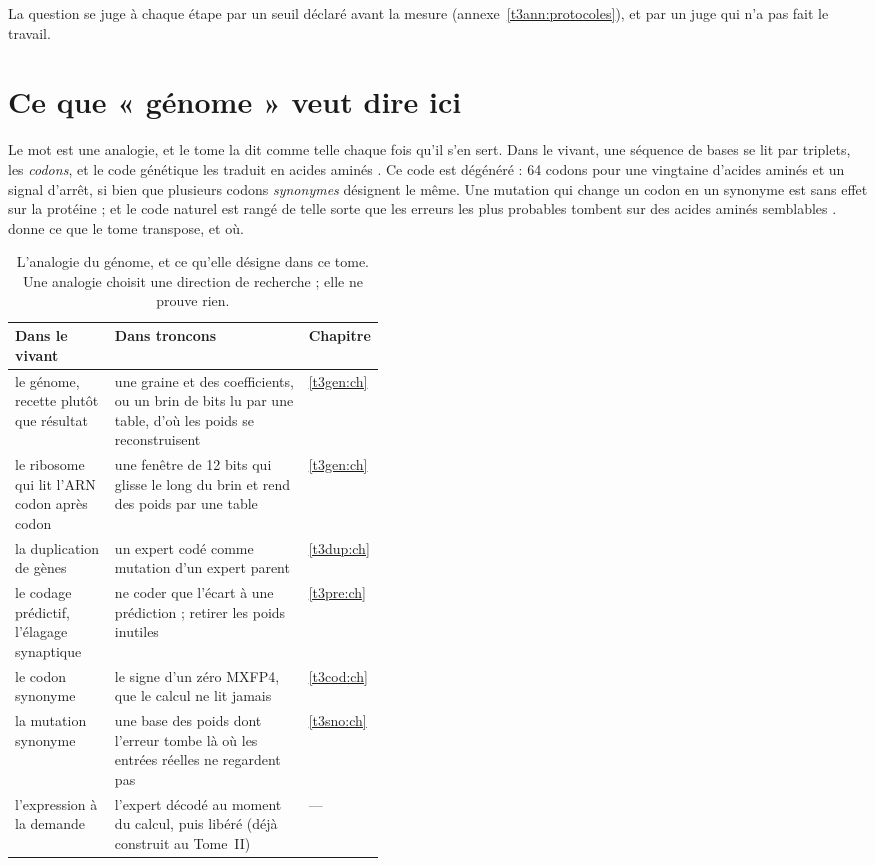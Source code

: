 La question se juge à chaque étape par un seuil déclaré avant la mesure (annexe~\ref{t3ann:protocoles}), et par un juge qui n'a pas fait le travail.

\section{Ce que « génome » veut dire ici}\label{t3int:sec:genome}

Le mot est une analogie, et le tome la dit comme telle chaque fois qu'il s'en sert. Dans le vivant, une séquence de bases se lit par triplets, les \emph{codons}, et le code génétique les traduit en acides aminés \parencite{genome-crick1961}. Ce code est dégénéré : 64 codons pour une vingtaine d'acides aminés et un signal d'arrêt, si bien que plusieurs codons \emph{synonymes} désignent le même. Une mutation qui change un codon en un synonyme est sans effet sur la protéine ; et le code naturel est rangé de telle sorte que les erreurs les plus probables tombent sur des acides aminés semblables \parencite{genome-crick1968,freeland1998}.  donne ce que le tome transpose, et où.

\begin{table}[ht]
\centering\footnotesize
\caption[L'analogie du génome, et ce qu'elle désigne ici]{L'analogie du génome, et ce qu'elle désigne dans ce tome. Une analogie choisit une direction de recherche ; elle ne prouve rien.}
\label{t3int:tab:analogie}
\begin{tabularx}{\linewidth}{@{}>{\raggedright\arraybackslash}p{0.27\linewidth}>{\raggedright\arraybackslash}X>{\raggedright\arraybackslash}p{0.16\linewidth}@{}}
\toprule
Dans le vivant & Dans troncons & Chapitre \\
\midrule
le génome, recette plutôt que résultat & une graine et des coefficients, ou un brin de bits lu par une table, d'où les poids se reconstruisent & \cref{t3gen:ch} \\
le ribosome qui lit l'ARN codon après codon & une fenêtre de 12 bits qui glisse le long du brin et rend des poids par une table & \cref{t3gen:ch} \\
la duplication de gènes & un expert codé comme mutation d'un expert parent & \cref{t3dup:ch} \\
le codage prédictif, l'élagage synaptique & ne coder que l'écart à une prédiction ; retirer les poids inutiles & \cref{t3pre:ch} \\
le codon synonyme & le signe d'un zéro MXFP4, que le calcul ne lit jamais & \cref{t3cod:ch} \\
la mutation synonyme & une base des poids dont l'erreur tombe là où les entrées réelles ne regardent pas & \cref{t3sno:ch} \\
l'expression à la demande & l'expert décodé au moment du calcul, puis libéré (déjà construit au Tome~II) & --- \\
\bottomrule
\end{tabularx}
\end{table}

